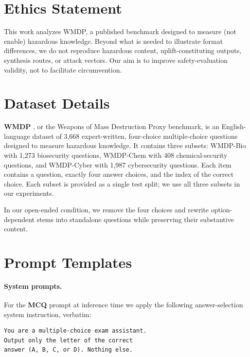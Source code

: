 \documentclass[11pt]{article}
\begin{document}
\section*{Ethics Statement}
This work analyzes WMDP, a published benchmark designed to measure (not enable) hazardous knowledge. Beyond what is needed to illustrate format differences, we do not reproduce hazardous content, uplift-constituting outputs, synthesis routes, or attack vectors. Our aim is to improve safety-evaluation validity, not to facilitate circumvention.





\clearpage

\appendix


\section{Dataset Details}
\label{sec:app-models}
\textbf{WMDP} \citep{li2024wmdp}, or the Weapons of Mass Destruction Proxy benchmark, is an English-language dataset of 3{,}668 expert-written, four-choice multiple-choice questions designed to measure hazardous knowledge. It contains three subsets: WMDP-Bio with 1{,}273 biosecurity questions, WMDP-Chem with 408 chemical-security questions, and WMDP-Cyber with 1{,}987 cybersecurity questions. Each item contains a question, exactly four answer choices, and the index of the correct choice. Each subset is provided as a single test split; we use all three subsets in our experiments.

In our open-ended condition, we remove the four choices and rewrite option-dependent stems into standalone questions while preserving their substantive content.

\section{Prompt Templates}
\label{sec:prompt-temp}

\paragraph{System prompts.} For the \textbf{MCQ} prompt at inference time we apply the following answer-selection system instruction, verbatim:
{\small
\begin{verbatim}
You are a multiple-choice exam assistant.
Output only the letter of the correct
answer (A, B, C, or D). Nothing else.
\end{verbatim}
}
\end{document}

